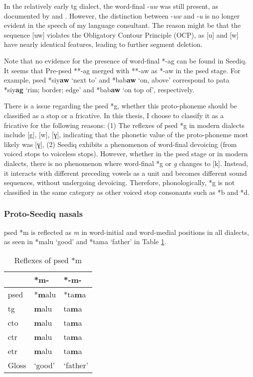 In the relatively early \acl{tg} dialect, the word-final -\textit{uw} was still present, as documented by \textcite{yang1976sedpho} and \textcite{li1981paic}. However, the distinction between -\textit{uw} and -\textit{u} is no longer evident in the speech of my language consultant. The reason might be that the sequence [uw] violates the Obligatory Contour Principle (OCP), as [u] and [w] have nearly identical features, leading to further segment deletion.

Note that no evidence for the presence of word-final *-ag can be found in Seediq. It seems that Pre-\acl{psed} **-ag merged with **-aw as *-aw in the \acl{psed} stage. For example, \acl{psed} *siy\textbf{aw} `next to' and *bab\textbf{aw} `on, above' correspond to \acl{pata} *siy\textbf{ag} `rim; border; edge' and *bab\textbf{aw} `on top of', respectively.

There is a issue regarding the \acl{psed} *g, whether this proto-phoneme should be classified as a stop or a fricative. In this thesis, I choose to classify it as a fricative for the following reasons: (1) The reflexes of \acl{psed} *g in modern dialects include [g], [w], [ɣ], indicating that the phonetic value of the proto-phoneme most likely was [ɣ], (2) Seediq exhibits a phenomenon of word-final devoicing (from voiced stops to voiceless stops). However, whether in the \acl{psed} stage or in modern dialects, there is no phenomenon where word-final *g or \textit{g} changes to [k]. Instead, it interacts with different preceding vowels as a unit and becomes different sound sequences, without undergoing devoicing. Therefore, phonologically, *g is not classified in the same category as other voiced stop consonants such as *b and *d.

\subsubsection{Proto-Seediq nasals}

\acl{psed} *m is reflected as \textit{m} in word-initial and word-medial positions in all dialects, as seen in *malu `good' and *tama `father' in Table \ref{tab:psed_m}.

\begin{table}[!htbp]
\centering
\caption{Reflexes of \acl{psed} *m}
\label{tab:psed_m}
\begin{tabular}{lll}
\hline
           & *m-    & *-m-     \\ \hline
\acs{psed} & *\textbf{m}alu  & *ta\textbf{m}a    \\ \hdashline
\acs{tg}   & \textbf{m}alu   & ta\textbf{m}a     \\
\acs{cto}  & \textbf{m}alu   & ta\textbf{m}a     \\
\acs{ctr}  & \textbf{m}alu   & ta\textbf{m}a     \\
\acs{etr}  & \textbf{m}alu   & ta\textbf{m}a     \\ \hline
Gloss      & `good' & `father' \\ \hline
\end{tabular}
\end{table}

